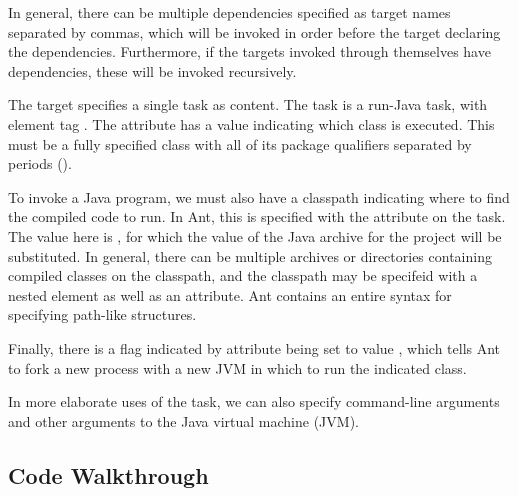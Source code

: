 In general, there can be multiple dependencies specified as target
names separated by commas, which will be invoked in order before the
target declaring the dependencies.  Furthermore, if the targets
invoked through  themselves have dependencies, these
will be invoked recursively.

The  target specifies a single task as content.  The task
is a run-Java task, with element tag .  The attribute
 has a value indicating which class is executed.  This
must be a fully specified class with all of its package qualifiers
separated by periods ().  

To invoke a Java program, we must also have a classpath indicating where
to find the compiled code to run.  In Ant, this is specified with
the  attribute on the  task.  The value here
is , for which the value of the Java archive for the
project will be substituted.  In general, there can be multiple archives
or directories containing compiled classes on the classpath, and the
classpath may be specifeid with a nested element as well as an attribute.
Ant contains an entire syntax for specifying path-like structures.

Finally, there is a flag indicated by attribute  being
set to value , which tells Ant to fork a new process with
a new JVM in which to run the indicated class.  

In more elaborate uses of the  task, we can also specify
command-line arguments and other arguments to the Java virtual machine
(JVM).  


\subsection{Code Walkthrough}
















